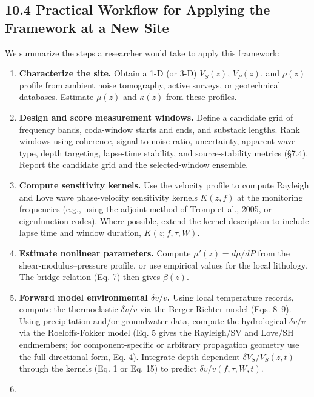 \documentclass[draft]{agujournal2019}
\providecommand{\tightlist}{%
  \setlength{\itemsep}{0pt}\setlength{\parskip}{0pt}}
\begin{document}
\subsection{10.4 Practical Workflow for Applying the Framework at a New
Site}\label{practical-workflow-for-applying-the-framework-at-a-new-site}

We summarize the steps a researcher would take to apply this framework:

\begin{enumerate}
\def\labelenumi{\arabic{enumi}.}
\tightlist
\item
  \textbf{Characterize the site.} Obtain a 1-D (or 3-D) \(V_S(z)\),
  \(V_P(z)\), and \(\rho(z)\) profile from ambient noise tomography,
  active surveys, or geotechnical databases. Estimate \(\mu(z)\) and
  \(\kappa(z)\) from these profiles.
\item
  \textbf{Design and score measurement windows.} Define a candidate grid
  of frequency bands, coda-window starts and ends, and substack lengths.
  Rank windows using coherence, signal-to-noise ratio, uncertainty,
  apparent wave type, depth targeting, lapse-time stability, and
  source-stability metrics (§7.4). Report the candidate grid and the
  selected-window ensemble.
\item
  \textbf{Compute sensitivity kernels.} Use the velocity profile to
  compute Rayleigh and Love wave phase-velocity sensitivity kernels
  \(K(z,f)\) at the monitoring frequencies (e.g., using the adjoint
  method of Tromp et al., 2005, or eigenfunction codes). Where possible,
  extend the kernel description to include lapse time and window
  duration, \(K(z;f,\tau,W)\).
\item
  \textbf{Estimate nonlinear parameters.} Compute \(\mu'(z) = d\mu/dP\)
  from the shear-modulus--pressure profile, or use empirical values for
  the local lithology. The bridge relation (Eq. 7) then gives
  \(\beta(z)\).
\item
  \textbf{Forward model environmental \(\delta v/v\).} Using local
  temperature records, compute the thermoelastic \(\delta v/v\) via the
  Berger-Richter model (Eqs. 8--9). Using precipitation and/or
  groundwater data, compute the hydrological \(\delta v/v\) via the
  Roeloffs-Fokker model (Eq. 5 gives the Rayleigh/SV and Love/SH
  endmembers; for component-specific or arbitrary propagation geometry
  use the full directional form, Eq. 4). Integrate depth-dependent
  \(\delta V_S/V_S(z,t)\) through the kernels (Eq. 1 or Eq. 15) to
  predict \(\delta v/v(f,\tau,W,t)\).
\item

\end{enumerate}
\end{document}
